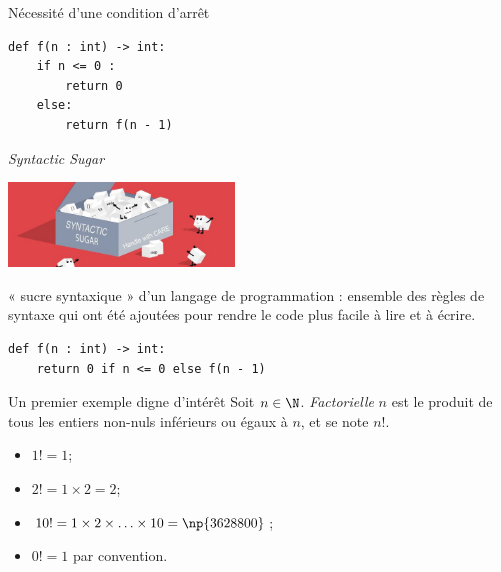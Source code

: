 \documentclass[10pt]{beamer}
\begin{document}
\begin{frame}[fragile]{Nécessité d'une condition d'arrêt}
\begin{verbatim}
def f(n : int) -> int:
    if n <= 0 :
        return 0
    else:
        return f(n - 1)
\end{verbatim}
\pause
{}


\end{frame}


\begin{frame}[fragile]{\textit{Syntactic Sugar}}
\begin{center}
\includegraphics[width=6cm]{img/syntactic_sugar}
\end{center}
 « sucre syntaxique » d'un langage de programmation : ensemble des règles de syntaxe qui ont été ajoutées pour rendre le code plus facile à lire et à écrire.\pause
\begin{verbatim}
def f(n : int) -> int:
    return 0 if n <= 0 else f(n - 1)
\end{verbatim}
\end{frame}




\begin{frame}[fragile]{Un premier exemple digne d'intérêt}
Soit $n\in\N$. \textit{Factorielle} $n$ est le produit de tous les entiers non-nuls inférieurs ou égaux à $n$, et se note $n!$.\pause
\begin{itemize}
	\item $1!=1$;\pause
	\item $2!=1\times2 = 2$;\pause
	\item $10!=1\times 2\times \ldots \times 10 = \np{3628800}$;\pause
	\item $0! = 1$ par convention.
\end{itemize}
\end{frame}
\end{document}
